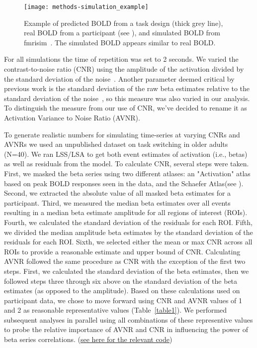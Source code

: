 \documentclass[phd,appendix,figures]{uithesis}
\begin{document}
\begin{figure}[H]
  \centering
  \texttt{[image: methods-simulation\_example]}
  \caption{
    Example of predicted BOLD from a task design (thick grey line), real BOLD
    from a participant (see ), and simulated BOLD
    from fmrisim~\cite{Ellis2020}.
    The simulated BOLD appears similar to real BOLD.
  }
  \label{fig:simulation_example}
\end{figure}

For all simulations the time of repetition was set to 2 seconds.
We varied the contrast-to-noise ratio (CNR) using the amplitude of the activation
divided by the standard deviation of the noise~\cite{Welvaert2013a}.
Another parameter deemed critical by previous work is the standard deviation
of the raw beta estimates relative to the standard deviation of the noise~\cite{Abdulrahman2016},
so this measure was also varied in our analysis.
To distinguish the measure from our use of CNR,
we've decided to rename it as Activation Variance to Noise Ratio (AVNR).

To generate realistic numbers for simulating time-series at varying CNRs and AVNRs
we used an unpublished dataset on task switching in older adults (N=40).
We ran LSS/LSA to get both event estimates of activation (i.e., betas)
as well as residuals from the model.
To calculate CNR, several steps were taken.
First, we masked the beta series using two different atlases:
an "Activation" atlas based on peak BOLD responses seen in the data,
and the Schaefer Atlas\cite{Schaefer2017}(see ).
Second, we extracted the absolute value of all masked beta estimates for a participant.
Third, we measured the median beta estimates over all events resulting
in a median beta estimate amplitude for all regions of interest (ROIs).
Fourth, we calculated the standard deviation of the residuals for each ROI.
Fifth, we divided the median amplitude beta estimates by the standard deviation of the residuals
for each ROI.
Sixth, we selected either the mean or max CNR across all ROIs to provide a reasonable estimate
and upper bound of CNR.
Calculating AVNR followed the same procedure as CNR with the exception of the first two steps.
First, we calculated the standard deviation of the beta estimates, then we followed steps three through six above
on the standard deviation of the beta estimates (as opposed to the amplitude).
Based on these calculations used on participant data, we chose to move forward using CNR and
AVNR values of 1 and 2 as reasonable representative values (Table~\ref{table1}).
We performed subsequent analyses in parallel using all combinations of these representive values to probe the relative importance of AVNR and CNR
in influencing the power of beta series correlations.
(\href{https://github.com/jdkent/BetaSeriesRealDataAnalysis/blob/b18b44321edf7b662a1e5ea635f64452c8d3644c/nibsAnalysis/cnr_trial_variability.ipynb}{see here for the relevant code})
\end{document}
